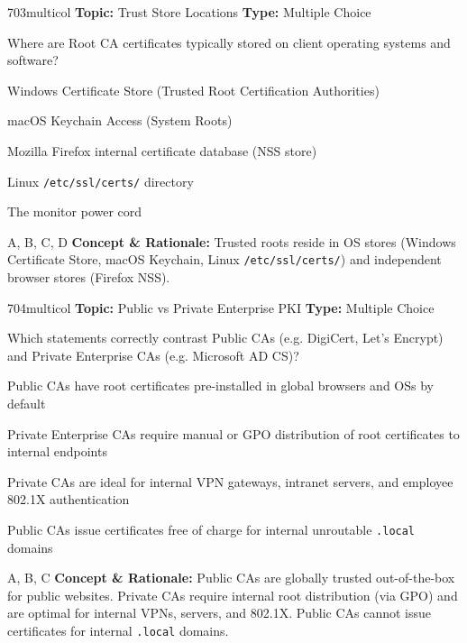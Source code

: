 \begin{qcard}{703}{multicol}
\textcolor{darkslate!75}{\small\textbf{Topic:} Trust Store Locations \hfill \textbf{Type:} Multiple Choice}\vspace{0.4em}\par
Where are Root CA certificates typically stored on client operating systems and software?
\begin{qoptions}
\item Windows Certificate Store (Trusted Root Certification Authorities)
\item macOS Keychain Access (System Roots)
\item Mozilla Firefox internal certificate database (NSS store)
\item Linux \texttt{/etc/ssl/certs/} directory
\item The monitor power cord
\end{qoptions}
\end{qcard}
\nopagebreak
\begin{explainbox}{A, B, C, D}
\textbf{Concept \& Rationale:} Trusted roots reside in OS stores (Windows Certificate Store, macOS Keychain, Linux \texttt{/etc/ssl/certs/}) and independent browser stores (Firefox NSS).
\end{explainbox}

\begin{qcard}{704}{multicol}
\textcolor{darkslate!75}{\small\textbf{Topic:} Public vs Private Enterprise PKI \hfill \textbf{Type:} Multiple Choice}\vspace{0.4em}\par
Which statements correctly contrast Public CAs (e.g. DigiCert, Let's Encrypt) and Private Enterprise CAs (e.g. Microsoft AD CS)?
\begin{qoptions}
\item Public CAs have root certificates pre-installed in global browsers and OSs by default
\item Private Enterprise CAs require manual or GPO distribution of root certificates to internal endpoints
\item Private CAs are ideal for internal VPN gateways, intranet servers, and employee 802.1X authentication
\item Public CAs issue certificates free of charge for internal unroutable \texttt{.local} domains
\end{qoptions}
\end{qcard}
\nopagebreak
\begin{explainbox}{A, B, C}
\textbf{Concept \& Rationale:} Public CAs are globally trusted out-of-the-box for public websites. Private CAs require internal root distribution (via GPO) and are optimal for internal VPNs, servers, and 802.1X. Public CAs cannot issue certificates for internal \texttt{.local} domains.
\end{explainbox}

